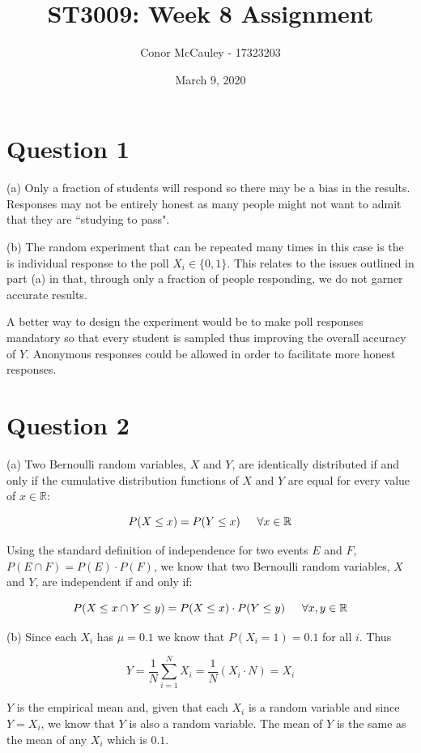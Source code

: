 \documentclass[12pt]{article}
\title{ST3009: Week 8 Assignment}
\author{Conor McCauley - 17323203}
\date{March 9, 2020}
\begin{document}
\maketitle

\section*{Question 1}

\noindent (a) Only a fraction of students will respond so there may be a bias in the results. Responses may not be entirely honest as many people might not want to admit that they are ``studying to pass".

\noindent (b) The random experiment that can be repeated many times in this case is the is individual response to the poll $X_i \in \{0, 1\}$. This relates to the issues outlined in part (a) in that, through only a fraction of people responding, we do not garner accurate results.

\indent A better way to design the experiment would be to make poll responses mandatory so that every student is sampled thus improving the overall accuracy of $Y$. Anonymous responses could be allowed in order to facilitate more honest responses.

\section*{Question 2}

\noindent (a) Two Bernoulli random variables, $X$ and $Y$, are identically distributed if and only if the cumulative distribution functions of $X$ and $Y$ are equal for every value of $x \in \mathbb{R}$:

$$ P(X \leq x) = P(Y \leq x) \indent \forall x \in \mathbb{R} $$

\indent Using the standard definition of independence for two events $E$ and $F$, $P(E \cap F) = P(E) \cdot P(F)$, we know that two Bernoulli random variables, $X$ and $Y$, are independent if and only if:

$$ P(X \leq x \cap Y \leq y) = P(X \leq x) \cdot P(Y \leq y) \indent \forall x, y \in \mathbb{R} $$

\noindent (b) Since each $X_i$ has $\mu = 0.1$ we know that $P(X_i = 1) = 0.1$ for all $i$. Thus

$$ Y = \frac{1}{N}\sum_{i = 1}^N X_i = \frac{1}{N} (X_i \cdot N) = X_i $$

\indent $Y$ is the empirical mean and, given that each $X_i$ is a random variable and since $Y = X_i$, we know that $Y$ is also a random variable. The mean of $Y$ is the same as the mean of any $X_i$ which is $0.1$.
\end{document}
